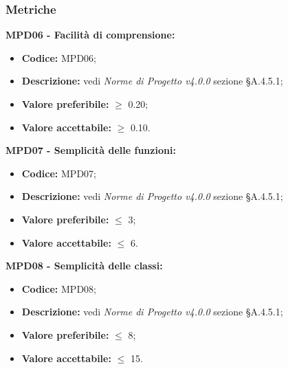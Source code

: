 \subsubsection{Metriche}
\textbf{MPD06 - Facilità di comprensione:}
\begin{itemize}
    \item \textbf{Codice:} MPD06;
    \item \textbf{Descrizione:} vedi \textit{Norme di Progetto v4.0.0} sezione \S A.4.5.1;
    \item \textbf{Valore preferibile:} $\geq$ 0.20;
    \item \textbf{Valore accettabile:} $\geq$ 0.10.
\end{itemize}
\textbf{MPD07 - Semplicità delle funzioni:}
\begin{itemize}
    \item \textbf{Codice:} MPD07;
    \item \textbf{Descrizione:} vedi \textit{Norme di Progetto v4.0.0} sezione \S A.4.5.1;
    \item \textbf{Valore preferibile:} $\leq$ 3;
    \item \textbf{Valore accettabile:} $\leq$ 6.
\end{itemize}
\textbf{MPD08 - Semplicità delle classi:}
\begin{itemize}
    \item \textbf{Codice:} MPD08;
    \item \textbf{Descrizione:} vedi \textit{Norme di Progetto v4.0.0} sezione \S A.4.5.1;
    \item \textbf{Valore preferibile:} $\leq$ 8;
    \item \textbf{Valore accettabile:} $\leq$ 15.
\end{itemize}
